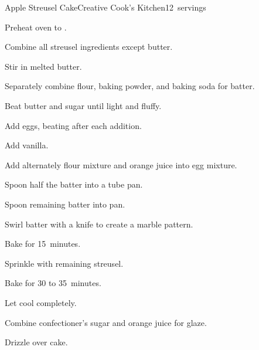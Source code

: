 \begin{recipe}{Apple Streusel Cake}{Creative Cook's Kitchen}{12~servings}
\begin{directions}
\item Preheat oven to .
\item Combine all streusel ingredients except butter.
\item Stir in melted butter.
\item Separately combine flour, baking powder, and baking soda for batter.
\item Beat butter and sugar until light and fluffy.
\item Add eggs, beating after each addition.
\item Add vanilla.
\item Add alternately flour mixture and orange juice into egg mixture.
\item Spoon half the batter into a tube pan.
\item Spoon remaining batter into pan.
\item Swirl batter with a knife to create a marble pattern.
\item Bake for 15~minutes.
\item Sprinkle with remaining streusel.
\item Bake for 30 to 35~minutes.
\item Let cool completely.
\item Combine confectioner's sugar and orange juice for glaze.
\item Drizzle over cake.
\end{directions}
\end{recipe}
